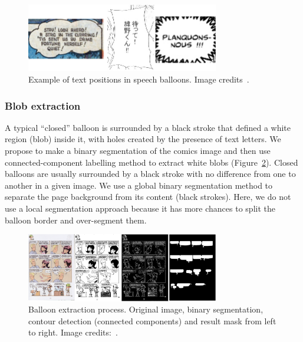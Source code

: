 	\begin{figure}[h!]	%
	  \centering
		\includegraphics[trim= 0px 0px 0px 0px, clip, width=0.75\textwidth]{text_in_balloon.png}
		\caption[Text positions in speech balloons]{Example of text positions in speech balloons. Image credits~\cite{McCall46,Inoue08,Bubble09}.}
		\label{fig:se:text_in_balloon}
	\end{figure}

\subsubsection{Blob extraction} %
\label{par:blob_extraction}

A typical ``closed'' balloon is surrounded by a black stroke that defined a white region (blob) inside it, with holes created by the presence of text letters.
We propose to make a binary segmentation of the comics image and then use connected-component labelling method to extract white blobs (Figure~\ref{fig:se:closed_balloon}).
Closed balloons are usually surrounded by a black stroke with no difference from one to another in a given image.
We use a global binary segmentation method to separate the page background from its content (black strokes).
Here, we do not use a local segmentation approach because it has more chances to split the balloon border and over-segment them.

	\begin{figure}[h!]	%
	  \centering
		\includegraphics[trim= 0px 0px 0px 0px, clip, width=0.75\textwidth]{closed_balloon_process.png}
		\caption[Sequential balloon extraction process illustration]{Balloon extraction process. Original image, binary segmentation, contour detection (connected components) and result mask from left to right. Image credits:~\cite{Midam01}. }
		\label{fig:se:closed_balloon}
	\end{figure}


